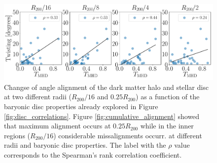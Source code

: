 \documentclass[usenatbib]{mnras}
\begin{document}
\begin{figure}
\begin{center}
\includegraphics[width=1.0\textwidth]{correlations_twisting_triaxiality_MHD.pdf}
\end{center}
\caption{Changse of angle alignment of the dark
  matter halo and stellar disc at two different radii ($R_{200}/16$
  and $0.25R_{200}$) as a function of the baryonic disc properties
  already explored in Figure \ref{fig:disc_correlations}.  
  Figure \ref{fig:cumulative_alignment} showed that maximum alignment
  occurs at $0.25R_{200}$ while in the inner regions ($R_{200}/16$)
  considerable missalignments occurr.
 at different radii
 and baryonic disc properties. 
 The label with the $\rho$ value corresponds to the Spearman’s rank correlation coefficient. }
\label{fig:alignment_correlations}
\end{figure}
\end{document}
